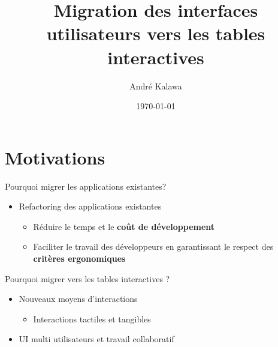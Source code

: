 \documentclass[11pt]{beamer}
\title{Migration des interfaces utilisateurs vers les tables interactives}
\author[Kalawa]{André Kalawa  } %
\institute{{\tiny Financement BDE: Région PACA/LudoTIC}}
\date{\today}
\begin{document}
\begin{frame}
\titlepage
\end{frame}

\begin{frame}
\tableofcontents
\end{frame}

\section{Motivations}

\begin{frame}{}
\begin{block}{Pourquoi migrer les applications existantes?}
\begin{itemize}
	\item {\small Refactoring des applications existantes}
		\begin{itemize}
			\item {\scriptsize Réduire le temps et le \textbf{coût de développement}}
			\item {\scriptsize Faciliter le travail des développeurs en garantissant le respect des \textbf{critères ergonomiques}}
		\end{itemize}
\end{itemize}
\end{block}
\pause
\begin{block}{Pourquoi migrer vers les tables interactives ?}
\begin{itemize}
\item {\scriptsize Nouveaux moyens d'interactions}
\begin{itemize}
		\item {\scriptsize Interactions tactiles et tangibles}
\end{itemize}
\item {\scriptsize UI multi utilisateurs et travail collaboratif}
\end{itemize}

\end{block}
\end{frame}
\end{document}
